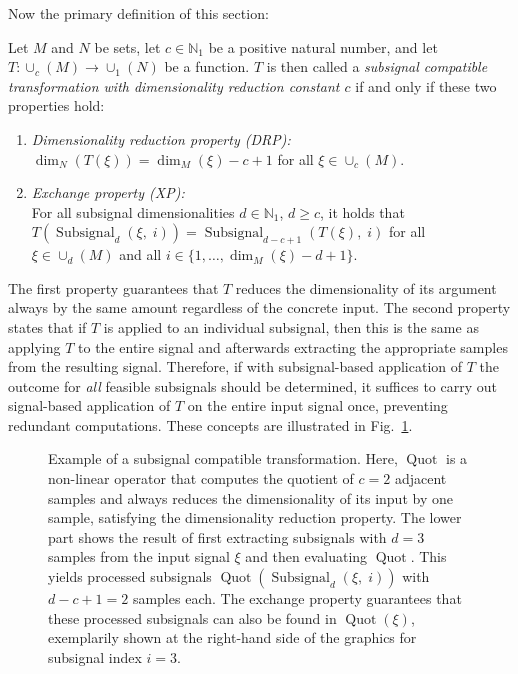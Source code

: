 \documentclass[journal]{IEEEtran}
\newcommand{\figurescalefactor}{0.995}
\newcommand{\N}{\mathbb{N}}
\newcommand{\discint}[2]{\{#1,\dotsc,#2\}}
\newcommand{\inint}[2]{\in\discint{#1}{#2}}
\DeclareMathOperator{\Subsignal}{Subsignal}
\begin{document}
Now the primary definition of this section:
\begin{definition}
\label{def:subsignal_compatible}
Let $M$ and $N$ be sets, let $c\in\N_1$ be a positive natural number, and let $T\colon \cup_c(M) \to \cup_1(N)$ be a function.
$T$ is then called a \emph{subsignal compatible transformation with dimensionality reduction constant $c$} if and only if these two properties hold:
\begin{enumerate}[label=(\roman*)]
  \item \emph{Dimensionality reduction property (DRP):}\\ $\dim_N(T(\xi)) = \dim_M(\xi) - c + 1$ for all $\xi\in\cup_c(M)$.
  \item \emph{Exchange property (XP):}\\ For all subsignal dimensionalities $d\in\N_1$, $d\geq c$, it holds that $T(\Subsignal_d(\xi,\;i)) = \Subsignal_{d - c + 1}(T(\xi),\;i)$ for all $\xi\in\cup_d(M)$ and all $i\inint{1}{\dim_M(\xi) - d + 1}$.
\end{enumerate}
\end{definition}

The first property guarantees that $T$ reduces the dimensionality of its argument always by the same amount regardless of the concrete input.
The second property states that if $T$ is applied to an individual subsignal, then this is the same as applying $T$ to the entire signal and afterwards extracting the appropriate samples from the resulting signal.
Therefore, if with subsignal-based application of $T$ the outcome for \emph{all} feasible subsignals should be determined, it suffices to carry out signal-based application of $T$ on the entire input signal once, preventing redundant computations.
These concepts are illustrated in Fig.~\ref{fig:exchange-property}.

\begin{figure}[t]
  \centering
  \scalebox{\figurescalefactor}{\texttt{[image: paper-pics.pdf]}}
  \caption{Example of a subsignal compatible transformation.
    Here, $\operatorname{Quot}$ is a non-linear operator that computes the quotient of $c = 2$ adjacent samples and always reduces the dimensionality of its input by one sample, satisfying the dimensionality reduction property.
    The lower part shows the result of first extracting subsignals with $d = 3$ samples from the input signal $\xi$ and then evaluating $\operatorname{Quot}$.
    This yields processed subsignals $\operatorname{Quot}\left(\Subsignal_d(\xi,\;i)\right)$ with $d - c + 1 = 2$ samples each.
    The exchange property guarantees that these processed subsignals can also be found in $\operatorname{Quot}(\xi)$, exemplarily shown at the right-hand side of the graphics for subsignal index $i = 3$.}
  \label{fig:exchange-property}
\end{figure}
\end{document}
